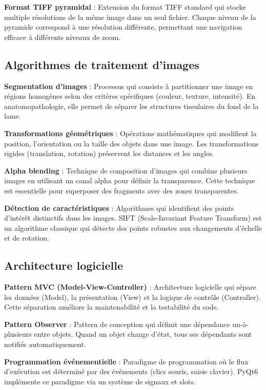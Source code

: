 \documentclass[12pt,a4paper]{report}
\begin{document}
\begin{}
\begin{}
\begin{}
\begin{}
\textbf{Format TIFF pyramidal} : Extension du format TIFF standard qui stocke multiple résolutions de la même image dans un seul fichier. Chaque niveau de la pyramide correspond à une résolution différente, permettant une navigation efficace à différents niveaux de zoom.

\subsection{Algorithmes de traitement d'images}

\textbf{Segmentation d'images} : Processus qui consiste à partitionner une image en régions homogènes selon des critères spécifiques (couleur, texture, intensité). En anatomopathologie, elle permet de séparer les structures tissulaires du fond de la lame.

\textbf{Transformations géométriques} : Opérations mathématiques qui modifient la position, l'orientation ou la taille des objets dans une image. Les transformations rigides (translation, rotation) préservent les distances et les angles.

\textbf{Alpha blending} : Technique de composition d'images qui combine plusieurs images en utilisant un canal alpha pour définir la transparence. Cette technique est essentielle pour superposer des fragments avec des zones transparentes.

\textbf{Détection de caractéristiques} : Algorithmes qui identifient des points d'intérêt distinctifs dans les images. SIFT (Scale-Invariant Feature Transform) est un algorithme classique qui détecte des points robustes aux changements d'échelle et de rotation.

\subsection{Architecture logicielle}

\textbf{Pattern MVC (Model-View-Controller)} : Architecture logicielle qui sépare les données (Model), la présentation (View) et la logique de contrôle (Controller). Cette séparation améliore la maintenabilité et la testabilité du code.

\textbf{Pattern Observer} : Pattern de conception qui définit une dépendance un-à-plusieurs entre objets. Quand un objet change d'état, tous ses dépendants sont notifiés automatiquement.

\textbf{Programmation événementielle} : Paradigme de programmation où le flux d'exécution est déterminé par des événements (clics souris, saisie clavier). PyQt6 implémente ce paradigme via un système de signaux et slots.


\end{}
\end{}
\end{}
\end{}
\end{document}
